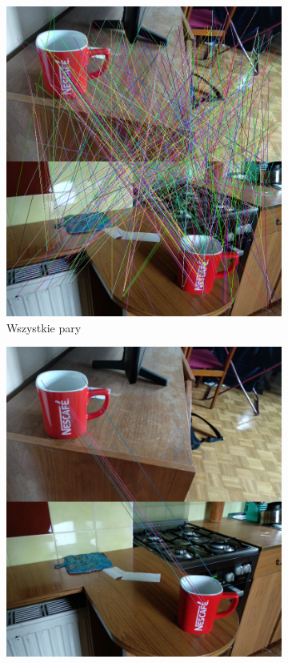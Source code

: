\documentclass{article}
\begin{document}
	\begin{figure}[H]
		\centering
		\begin{subfigure}[b]{0.4\linewidth}
			\includegraphics[width=\linewidth]{kua.png}
			\caption{Wszystkie pary}
		\end{subfigure}
		\begin{subfigure}[b]{0.4\linewidth}
			\includegraphics[width=\linewidth]{kuc.png}

\end{subfigure}
\end{figure}
\end{document}
